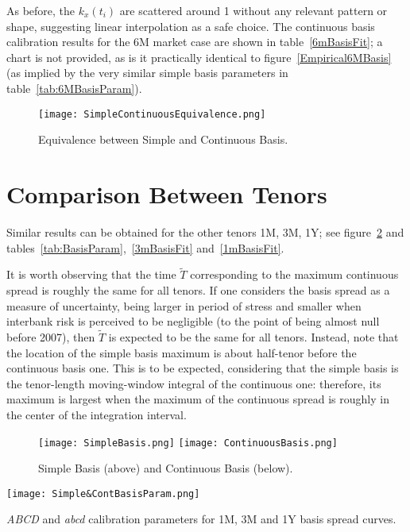 \documentclass{article}
\begin{document}
As before, the $k_x(t_i)$ are scattered around 1 without any relevant pattern or shape, suggesting linear interpolation as a safe choice. The continuous basis calibration results for the 6M market case are shown in table~\ref{6mBasisFit}; a chart is not provided, as is it practically identical to figure~\ref{Empirical6MBasis} (as implied by the very similar simple basis parameters in table~\ref{tab:6MBasisParam}).


\begin{figure}[t]
\centering
\texttt{[image: SimpleContinuousEquivalence.png]}
\caption{Equivalence between Simple and Continuous Basis.}
\label{SimpleContinuousEquivalence}
\end{figure}






\section{Comparison Between Tenors}
\label{sec:tenor-comparison}


Similar results can be obtained for the other tenors 1M, 3M, 1Y; see figure~\ref{SimpleAndContinuousBasis} and tables~\ref{tab:BasisParam},~\ref{3mBasisFit} and~\ref{1mBasisFit}.

It is worth observing that the time $\tilde{T}$ corresponding to the maximum continuous spread is roughly the same for all tenors. If one considers the basis spread as a measure of uncertainty, being larger in period of stress and smaller when interbank risk is perceived to be negligible (to the point of being almost null before 2007), then $\tilde{T}$ is expected to be the same for all tenors. Instead, note that the location of the simple basis maximum is about half-tenor before the continuous basis one. This is to be expected, considering that the simple basis is the tenor-length moving-window integral of the continuous one: therefore, its maximum is largest when the maximum of the continuous spread is roughly in the center of the integration interval.
 
\begin{figure}[t]
\centering
\texttt{[image: SimpleBasis.png]}\vfil
\texttt{[image: ContinuousBasis.png]}
\caption{Simple Basis (above) and Continuous Basis (below).}
\label{SimpleAndContinuousBasis}
\end{figure}

\begin{table}
\centering
\texttt{[image: Simple\&ContBasisParam.png]}
\caption{\textit{ABCD} and \textit{abcd} calibration parameters for 1M, 3M and 1Y basis spread curves.}
\label{tab:BasisParam}
\end{table}
\end{document}
